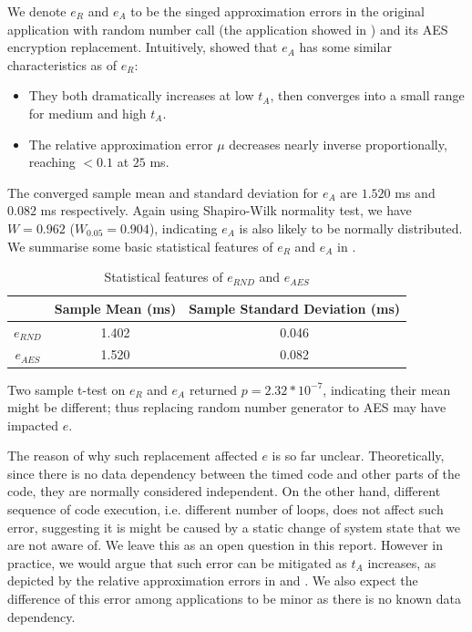 We denote $e_{R}$ and $e_{A}$ to be the singed approximation errors in the original application with random number call (the application showed in ) and its AES encryption replacement. Intuitively,   showed that $e_{A}$ has some similar characteristics as of $e_{R}$:
\begin{itemize}
	\item They both dramatically increases at low $t_A$, then converges into a small range for medium and high $t_A$.
	\item The relative approximation error $\mu$ decreases nearly inverse proportionally, reaching $<0.1$ at $25$ ms.
\end{itemize}

The converged sample mean and standard deviation for $e_A$ are $1.520$ ms and $0.082$ ms respectively. Again using Shapiro-Wilk normality test, we have $W=0.962$ ($W_{0.05} = 0.904$), indicating $e_{A}$ is also likely to be normally distributed. We summarise some basic statistical features of $e_R$ and $e_A$ in .

\begin{table}[ht!]
	\center
	\begin{tabular}{|c|c|c|}
	\hline
	      & Sample Mean (ms) & Sample Standard Deviation (ms) \\ \hline
	$e_{RND}$ & 1.402            & 0.046                          \\ \hline
	$e_{AES}$ & 1.520            & 0.082                          \\ \hline
	\end{tabular}
	\caption{Statistical features of $e_{RND}$ and $e_{AES}$}
	\label{Tbl: Statistical features of eR and eA}
\end{table}

Two sample t-test on $e_R$ and $e_A$ returned $p=2.32 * 10^{-7}$, indicating their mean might be different; thus replacing random number generator to AES may have impacted $e$.

The reason of why such replacement affected $e$ is so far unclear. Theoretically, since there is no data dependency between the timed code and other parts of the code, they are normally considered independent. On the other hand, different sequence of code execution, i.e. different number of loops, does not affect such error, suggesting it is might be caused by a static change of  system state that we are not aware of. We leave this as an open question in this report. However in practice, we would argue that such error can be mitigated as $t_A$ increases, as depicted by the relative approximation errors in  and . We also expect the difference of this error among applications to be minor as there is no known data dependency.

